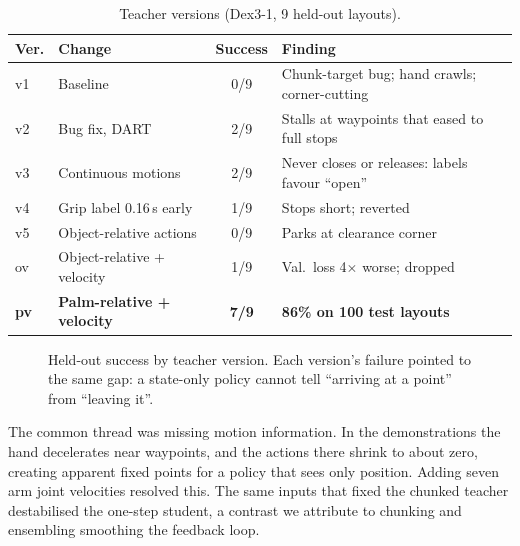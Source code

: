 \documentclass[10pt,twocolumn]{article}
\begin{document}
\begin{table}[t]
\centering\footnotesize
\caption{Teacher versions (Dex3-1, 9 held-out layouts).}
\label{tab:versions}
\setlength{\tabcolsep}{3pt}
\begin{tabular}{@{}l>{\raggedright\arraybackslash}p{3.0cm}c>{\raggedright\arraybackslash}p{3.0cm}@{}}
\toprule
Ver. & Change & Success & Finding\\
\midrule
v1 & Baseline & 0/9 & Chunk-target bug; hand crawls; corner-cutting\\
v2 & Bug fix, DART & 2/9 & Stalls at waypoints that eased to full stops\\
v3 & Continuous motions & 2/9 & Never closes or releases: labels favour ``open''\\
v4 & Grip label 0.16\,s early & 1/9 & Stops short; reverted\\
v5 & Object-relative actions & 0/9 & Parks at clearance corner\\
ov & Object-relative + velocity & 1/9 & Val.\ loss 4$\times$ worse; dropped\\
\textbf{pv} & \textbf{Palm-relative + velocity} & \textbf{7/9} & \textbf{86\% on 100 test layouts}\\
\bottomrule
\end{tabular}
\end{table}

\begin{figure}[t]
\centering
{}
\caption{Held-out success by teacher version. Each version's failure pointed to the same gap: a state-only policy
cannot tell ``arriving at a point'' from ``leaving it''.}
\label{fig:versions}
\end{figure}

The common thread was missing motion information. In the demonstrations the hand decelerates near waypoints, and the
actions there shrink to about zero, creating apparent fixed points for a policy that sees only position. Adding seven arm
joint velocities resolved this. The same inputs that fixed the chunked teacher destabilised the one-step student, a
contrast we attribute to chunking and ensembling smoothing the feedback loop.
\end{document}
